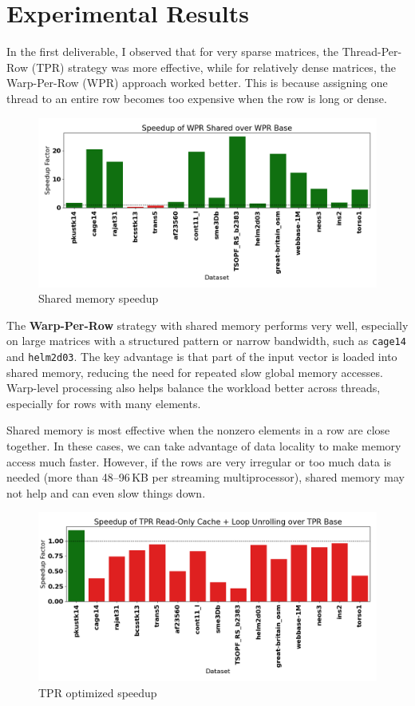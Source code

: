 \documentclass[conference]{IEEEtran}
\begin{document}
\section{Experimental Results}


In the first deliverable, I observed that for very sparse matrices, the Thread-Per-Row (TPR) strategy was more effective, while for relatively dense matrices, the Warp-Per-Row (WPR) approach worked better. This is because assigning one thread to an entire row becomes too expensive when the row is long or dense.

\begin{figure}[ht]
    \centering
    \includegraphics[width=0.95\linewidth]{speedup.png}
    \caption{Shared memory speedup}
    \label{fig:wpr_shared_speedup}
\end{figure}

The \textbf{Warp-Per-Row} strategy with shared memory performs very well, especially on large matrices with a structured pattern or narrow bandwidth, such as \texttt{cage14} and \texttt{helm2d03}. The key advantage is that part of the input vector is loaded into shared memory, reducing the need for repeated slow global memory accesses. Warp-level processing also helps balance the workload better across threads, especially for rows with many elements.

Shared memory is most effective when the nonzero elements in a row are close together. In these cases, we can take advantage of data locality to make memory access much faster. However, if the rows are very irregular or too much data is needed (more than 48--96\,KB per streaming multiprocessor), shared memory may not help and can even slow things down.

\begin{figure}[ht]
    \centering
    \includegraphics[width=0.95\linewidth]{speedupTPR.png}
    \caption{TPR optimized speedup}
    \label{fig:tpr_loop_speedup}
\end{figure}
\end{document}
